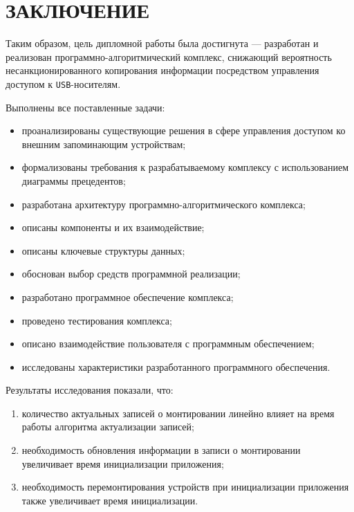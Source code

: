 \chapter*{ЗАКЛЮЧЕНИЕ}

Таким образом, цель дипломной работы была достигнута --- разработан и реализован программно-алгоритмический
комплекс, снижающий вероятность несанкционированного копирования информации посредством управления доступом к \texttt{USB}-носителям.

Выполнены все поставленные задачи:
\begin{itemize}[label=---]
    \item проанализированы существующие решения в сфере управления доступом ко внешним запоминающим устройствам;
    \item формализованы требования к разрабатываемому комплексу с использованием диаграммы прецедентов;
    \item разработана архитектуру программно-алгоритмического комплекса;
    \item описаны компоненты и их взаимодействие;
    \item описаны ключевые структуры данных;
    \item обоснован выбор средств программной реализации;
    \item разработано программное обеспечение комплекса;
    \item проведено тестирования комплекса;
    \item описано взаимодействие пользователя с программным обеспечением;
    \item исследованы характеристики разработанного программного обеспечения.
\end{itemize}

Результаты исследования показали, что:

\begin{enumerate}
    \item количество актуальных записей о монтировании линейно влияет на время работы алгоритма актуализации записей;
    \item необходимость обновления информации в записи о монтировании увеличивает время инициализации приложения;
    \item необходимость перемонтирования устройств при инициализации приложения также увеличивает время инициализации.
\end{enumerate}